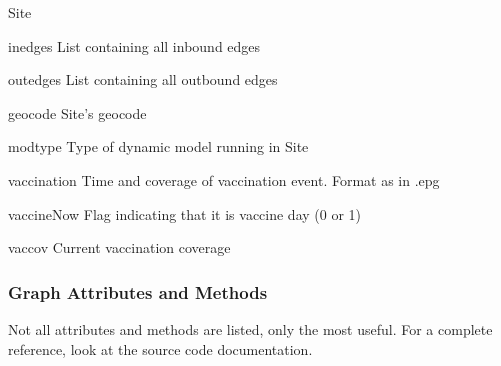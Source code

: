 \documentclass[a4paper,10pt]{manual}
\begin{document}
\begin{classdesc}{Site}{}
\hypertarget{Site.inedges}{}\begin{memberdesc}{inedges}
List containing all inbound edges
\end{memberdesc}


\hypertarget{Site.outedges}{}\begin{memberdesc}{outedges}
List containing all outbound edges
\end{memberdesc}


\hypertarget{Site.geocode}{}\begin{memberdesc}{geocode}
Site's geocode
\end{memberdesc}


\hypertarget{Site.modtype}{}\begin{memberdesc}{modtype}
Type of dynamic model running in Site
\end{memberdesc}


\hypertarget{Site.vaccination}{}\begin{memberdesc}{vaccination}
Time and coverage of vaccination event. Format as in .epg
\end{memberdesc}


\hypertarget{Site.vaccineNow}{}\begin{memberdesc}{vaccineNow}
Flag indicating that it is vaccine day (0 or 1)
\end{memberdesc}


\hypertarget{Site.vaccov}{}\begin{memberdesc}{vaccov}
Current vaccination coverage
\end{memberdesc}
\end{classdesc}


\subsubsection{Graph Attributes and Methods}

Not all attributes and methods are listed, only the most useful. For a complete reference, look at the source code documentation.
\end{document}
